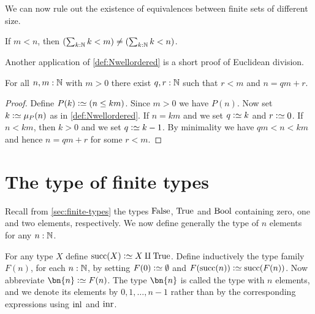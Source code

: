 We can now rule out the existence of equivalences between finite
sets of different size.
\begin{corollary}\label{cor:Fin-n-injective}
If $m<n$, then $(\sum_{k:\mathbb{N}} k<m) \neq (\sum_{k:\mathbb{N}} k<n)$.
\end{corollary}

Another application of \cref{def:Nwellordered} is a
short proof of Euclidean division. 
\begin{lemma}\label{lem:euclid-div}
For all $n,m:\mathbb{N}$ with $m>0$ there exist $q,r:\mathbb{N}$ such that $r<m$ and $n=qm+r$.
\end{lemma}
\begin{proof}
Define $P(k)\defeq (n\leq km)$. Since $m>0$ we have $P(n)$.
Now set $k\defeq\mu_P(n)$ as in \cref{def:Nwellordered}.
If $n=km$ and we set $q\defeq k$ and $r\defeq 0$.
If $n<km$, then $k>0$ and we set $q\defeq k-1$.
By minimality we have $qm<n<km$ and hence $n=qm+r$ for some $r<m$.
\end{proof}

\section{The type of finite types}
\label{sec:typeFin}
Recall from \cref{sec:finite-types} the types
$\mathrm{False}$, $\mathrm{True}$ and $\mathrm{Bool}$ containing zero, one and two
elements, respectively. We now define generally the
type of $n$ elements for any $n:\mathbb{N}$.

\begin{definition}\label{def:finiteset}
For any type $X$ define $\Succ(X)\defeq X\amalg\true$.
Define inductively the type family $F(n)$, for each $n:\mathbb{N}$, by
setting $F(0)\defeq\emptytype$ and $F(\Succ(n))\defeq\Succ(F(n))$.
Now abbreviate $\bn{n}\defeq F(n)$. The type $\bn{n}$ is called
the type with $n$ elements, and we denote its elements
by $0,1,\ldots,n-1$ rather than by the corresponding expressions
using $\inl{}$ and $\inr{}$.
\end{definition}


